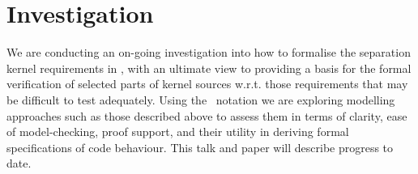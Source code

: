 \section{Investigation}

We are conducting an on-going investigation into how to formalise
the separation kernel requirements in \cite{IMAKQP-D02},
with an ultimate view to providing a basis for the formal verification
of selected parts of kernel sources w.r.t. those requirements that
may be difficult to test adequately.
Using the \Circus\ notation we are exploring modelling approaches
such as those described above
to assess them in terms of clarity, ease of model-checking, proof support,
and their utility in deriving formal specifications of code behaviour.
This talk and paper will describe progress to date.
